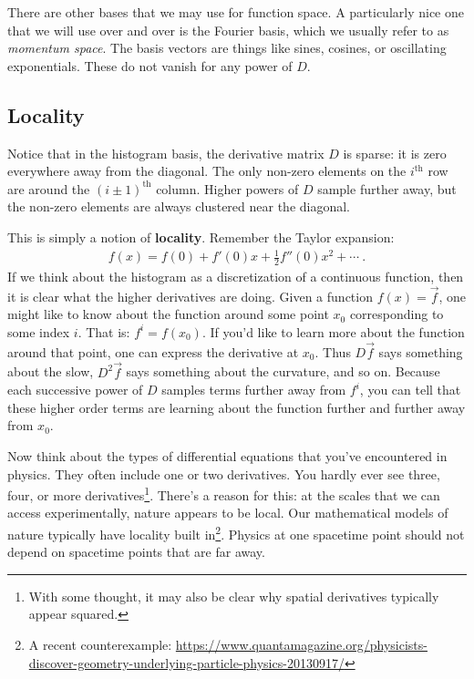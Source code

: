 There are other bases that we may use for function space. A particularly nice one that we will use over and over is the Fourier basis, which we usually refer to as \emph{momentum space}. The basis vectors are things like sines, cosines, or oscillating exponentials. These do not vanish for any power of $D$.


\subsection{Locality}

Notice that in the histogram basis, the derivative matrix $D$ is sparse: it is zero everywhere away from the diagonal. The only non-zero elements on the $i^\text{th}$ row are around the $(i\pm 1)^\text{th}$ column.  Higher powers of $D$ sample further away, but the non-zero elements are always clustered near the diagonal.

This is simply a notion of \textbf{locality}. Remember the Taylor expansion:
\begin{align}
  f(x) = f(0) + f'(0) x + \frac{1}{2} f''(0)x^2 + \cdots \ .
\end{align}
If we think about the histogram as a discretization of a continuous function, then it is clear what the higher derivatives are doing. Given a function $f(x) = \vec{f}$, one might like to know about the function around some point $x_0$ corresponding to some index $i$. That is: $f^i = f(x_0)$. If you’d like to learn more about the function around that point, one can express the derivative at $x_0$. Thus $D\vec{f}$ says something about the slow, $D^2\vec{f}$ says something about the curvature, and so on. Because each successive power of $D$ samples terms further away from $f^i$, you can tell that these higher order terms are learning about the function further and further away from $x_0$. 

Now think about the types of differential equations that you’ve encountered in physics. They often include one or two derivatives. You hardly ever see three, four, or more derivatives\footnote{With some thought, it may also be clear why spatial derivatives typically appear squared.}. There’s a reason for this: at the scales that we can access experimentally, nature appears to be local. Our mathematical models of nature typically have locality built in\footnote{A recent counterexample: \url{https://www.quantamagazine.org/physicists-discover-geometry-underlying-particle-physics-20130917/}}. Physics at one spacetime point should not depend on spacetime points that are far away. 


